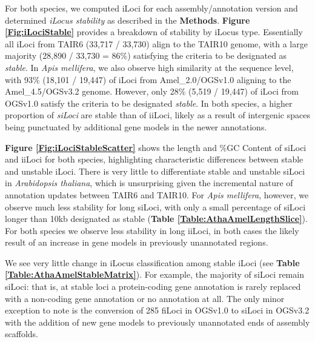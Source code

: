 For both species, we computed iLoci for each assembly/annotation version and determined \textit{iLocus stability} as described in the \textbf{Methods}.
\textbf{Figure \ref{Fig:iLociStable}} provides a breakdown of stability by iLocus type.
Essentially all iLoci from TAIR6 (33,717 / 33,730) align to the TAIR10 genome, with a large majority (28,890 / 33,730 = 86\%) satisfying the criteria to be designated as \textit{stable}.
In \textit{Apis mellifera}, we also observe high similarity at the sequence level, with 93\% (18,101 / 19,447) of iLoci from Amel\_2.0/OGSv1.0 aligning to the Amel\_4.5/OGSv3.2 genome.
However, only 28\% (5,519 / 19,447) of iLoci from OGSv1.0 satisfy the criteria to be designated \textit{stable}.
In both species, a higher proportion of \textit{siLoci} are stable than of iiLoci, likely as a result of intergenic spaces being punctuated by additional gene models in the newer annotations.

\textbf{Figure \ref{Fig:iLociStableScatter}} shows the length and \%GC Content of siLoci and iiLoci for both species, highlighting characteristic differences between stable and unstable iLoci.
There is very little to differentiate stable and unstable siLoci in \textit{Arabidopsis thaliana}, which is unsurprising given the incremental nature of annotation updates between TAIR6 and TAIR10.
For \textit{Apis mellifera}, however, we observe much less stability for long siLoci, with only a small percentage of siLoci longer than 10kb designated as stable (\textbf{Table \ref{Table:AthaAmelLengthSlice}}).
For both species we observe less stability in long iiLoci, in both cases the likely result of an increase in gene models in previously unannotated regions.

We see very little change in iLocus classification among stable iLoci (see \textbf{Table \ref{Table:AthaAmelStableMatrix}}).
For example, the majority of siLoci remain siLoci: that is, at stable loci a protein-coding gene annotation is rarely replaced with a non-coding gene annotation or no annotation at all.
The only minor exception to note is the conversion of 285 fiLoci in OGSv1.0 to siLoci in OGSv3.2 with the addition of new gene models to previously unannotated ends of assembly scaffolds.

